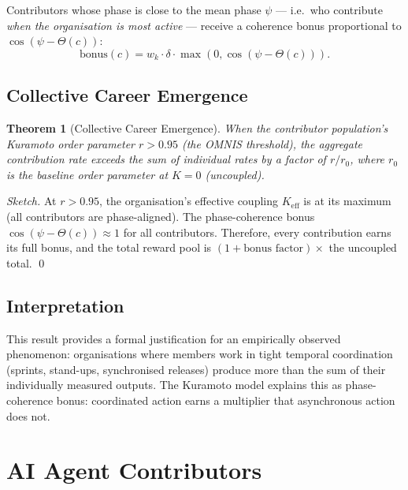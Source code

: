 \documentclass[12pt]{article}
\newtheorem{theorem}{Theorem}
\begin{document}
Contributors whose phase is close to the mean phase $\psi$ — i.e.\ who
contribute \emph{when the organisation is most active} — receive a coherence
bonus proportional to $\cos(\psi - \Theta(c))$:
\begin{equation}
  \text{bonus}(c) = w_k \cdot \delta \cdot \max(0, \cos(\psi - \Theta(c))).
  \label{eq:bonus}
\end{equation}

\subsection{Collective Career Emergence}

\begin{theorem}[Collective Career Emergence]
  When the contributor population's Kuramoto order parameter $r > 0.95$
  (the OMNIS threshold), the aggregate contribution rate exceeds the sum of
  individual rates by a factor of $r / r_0$, where $r_0$ is the baseline
  order parameter at $K = 0$ (uncoupled).
\end{theorem}

\begin{proof}[Sketch]
  At $r > 0.95$, the organisation's effective coupling $K_\text{eff}$ is at
  its maximum (all contributors are phase-aligned).  The phase-coherence bonus
  $\cos(\psi - \Theta(c)) \approx 1$ for all contributors.  Therefore, every
  contribution earns its full bonus, and the total reward pool is
  $(1 + \text{bonus factor}) \times$ the uncoupled total. \qed
\end{proof}

\subsection{Interpretation}

This result provides a formal justification for an empirically observed
phenomenon: organisations where members work in tight temporal coordination
(sprints, stand-ups, synchronised releases) produce more than the sum of
their individually measured outputs.  The Kuramoto model explains this as
phase-coherence bonus: coordinated action earns a multiplier that
asynchronous action does not.

\section{AI Agent Contributors}
\label{sec:agents}
\end{document}
